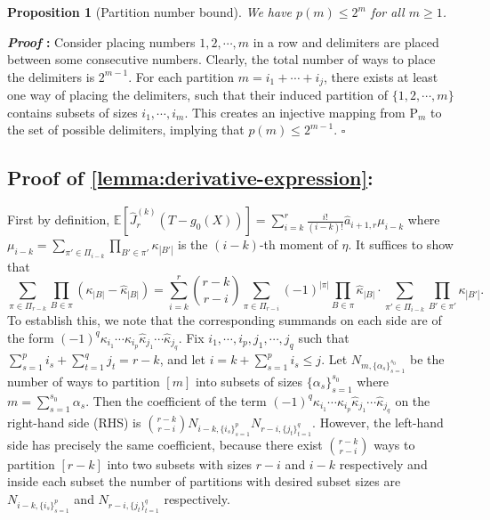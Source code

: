 \documentclass{article}
\newcommand{\E}{\mathbb{E}}
\newcommand{\ncref}[1]{\cref{#1}: \nameref*{#1}} %
\newcommand{\pcref}[1]{Proof of \ncref{#1}} %
\newtheorem{proposition}{Proposition}[section]
\renewenvironment{proof}{\noindent\textbf{\textit{Proof }:}}{\hfill$\square$}
\begin{document}
\begin{proposition}[Partition number bound]
\label{prop:partition-number-bound}
    We have $p(m)\leq 2^m$ for all $m\geq 1$.
\end{proposition}
\begin{proof}
    Consider placing numbers $1,2,\cdots,m$ in a row and delimiters are placed between some consecutive numbers. Clearly, the total number of ways to place the delimiters is $2^{m-1}$. For each partition $m = i_1+\cdots+i_j$, there exists at least one way of placing the delimiters, such that their induced partition of $\{1,2,\cdots,m\}$ contains subsets of sizes $i_1,\cdots,i_m$. This creates an injective mapping from $\mathrm{P}_m$ to the set of possible delimiters, implying that $p(m)\leq 2^{m-1}$.
\end{proof}

\subsection{\pcref{lemma:derivative-expression}}

First by definition, $\E\left[\hat{J}_r^{(k)}(T-g_0(X))\right] 
= \sum_{i=k}^{r} \frac{i!}{(i-k)!} \hat{a}_{i+1,r} \mu_{i-k}$ where $\mu_{i-k} = \sum_{\pi'\in\Pi_{i-k}}\prod_{B'\in\pi'} \kappa_{|B'|}$ is the $(i-k)$-th moment of $\eta$. 
It suffices to show that
\begin{equation}
    \label{eq:good-test-func-kth-derivative}
    \sum_{\pi\in\Pi_{r-k}}\prod_{B\in\pi} \left(\kappa_{|B|}-\hat{\kappa}_{|B|}\right) = \sum_{i=k}^r \binom{r-k}{r-i} \sum_{\pi\in\Pi_{r-i}} (-1)^{|\pi|} \prod_{B\in\pi}\hat{\kappa}_{|B|} \cdot \sum_{\pi'\in\Pi_{i-k}}\prod_{B'\in\pi'} \kappa_{|B'|}. 
\end{equation}
To establish this, we note that the corresponding summands on each side are of the form $(-1)^q\kappa_{i_1}\cdots\kappa_{i_p}\hat{\kappa}_{j_1}\cdots\hat{\kappa}_{j_q}$. Fix $i_1,\cdots,i_p,j_1,\cdots,j_q$ such that $\sum_{s=1}^p i_s + \sum_{t=1}^q j_t = r-k$, and let $i=k+\sum_{s=1}^p i_s\leq j$. Let $N_{m,\{\alpha_s\}_{s=1}^{s_0}}$ be the number of ways to partition $[m]$ into subsets of sizes $\{\alpha_s\}_{s=1}^{s_0}$ where $m=\sum_{s=1}^{s_0}\alpha_s$. Then the coefficient of the term $(-1)^q\kappa_{i_1}\cdots\kappa_{i_p}\hat{\kappa}_{j_1}\cdots\hat{\kappa}_{j_q}$ on the right-hand side (RHS) is $\binom{r-k}{r-i}N_{i-k,\{i_s\}_{s=1}^p}N_{r-i,\{j_t\}_{t=1}^q}$. However, the left-hand side has precisely the same coefficient, because there exist $\binom{r-k}{r-i}$ ways to partition $[r-k]$ into two subsets with sizes $r-i$ and $i-k$ respectively and inside each subset the number of partitions with desired subset sizes are $N_{i-k,\{i_s\}_{s=1}^p}$ and $N_{r-i,\{j_t\}_{t=1}^q}$ respectively.
\end{document}
